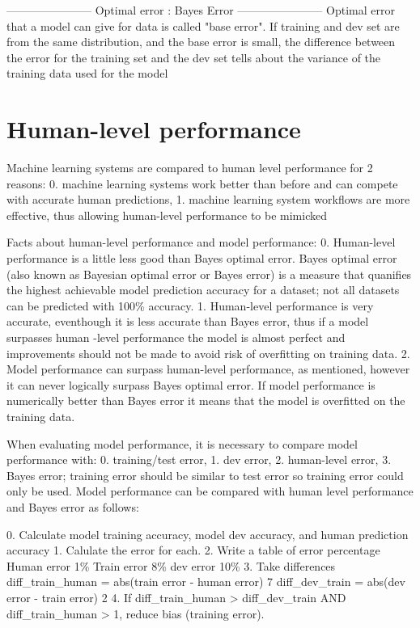 \documentclass[11pt, onecolumn]{article}
\begin{document}
-----------------------
Optimal error : Bayes Error
-----------------------
Optimal error that a model can give for data is called "base error". If training and dev set are from the same distribution, and the base error is small, the difference between the error for the training set and the dev set tells about the variance of the training data used for the model



\section{Human-level performance}

Machine learning systems are compared to human level performance for 2 reasons:
0. machine learning systems work better than before and can compete with accurate human predictions,
1. machine learning system workflows are more effective, thus allowing human-level performance to be mimicked


Facts about human-level performance and model performance:
0. Human-level performance is a little less good than Bayes optimal error. Bayes optimal error (also known as Bayesian optimal error or Bayes error) is a measure that quanifies the highest achievable model prediction accuracy for a dataset; not all datasets can be predicted with 100\% accuracy.
1. Human-level performance is very accurate, eventhough it is less accurate than Bayes error, thus if a model surpasses human -level performance the model is almost perfect and improvements should not be made to avoid risk of overfitting on training data.
2. Model performance can surpass human-level performance, as mentioned, however it can never logically surpass Bayes optimal error. If model performance is numerically better than Bayes error it means that the model is overfitted on the training data.


When evaluating model performance, it is necessary to compare model performance with: 0. training/test error, 1. dev error, 2. human-level error, 3. Bayes error; training error should be similar to test error so training error could only be used. Model performance can be compared with human level performance and Bayes error as follows:

0. Calculate model training accuracy, model dev accuracy, and human prediction accuracy
1. Calulate the error for each.
2. Write a table of error percentage
Human error	1\%
Train error 	8\%
dev error	10\%
3. Take differences
diff_train_human = abs(train error - human error) 	7
diff_dev_train = abs(dev error - train error)		2
4. If diff_train_human > diff_dev_train AND diff_train_human > 1, reduce bias (training error).
\end{document}
